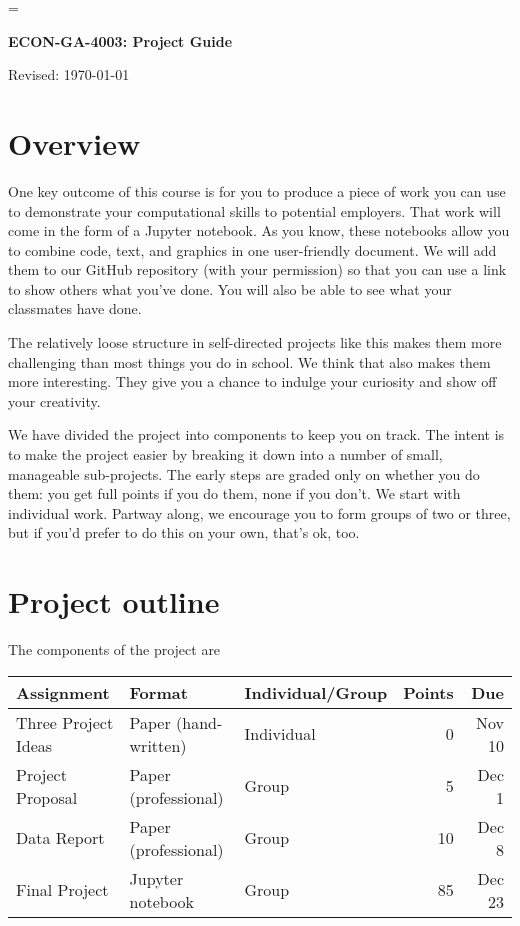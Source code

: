 \documentclass[11pt]{article}
\begin{document}
\parskip=\bigskipamount
\parindent=0.0in
\thispagestyle{empty}


\bigskip\bigskip
\centerline{\Large \bf ECON-GA-4003:  Project Guide}
\centerline{Revised: \today}

\section*{Overview}

One key outcome of this course is for you to produce a piece of work you can use
to demonstrate your computational skills to potential employers. That work will
come in the form of a Jupyter notebook. As you know, these
notebooks allow you to combine code, text, and graphics in one user-friendly
document. We will add them to our GitHub repository (with your permission) so that you can use a link
to show others what you've done. You will also be able to see what your
classmates have done.

The relatively loose structure in self-directed projects like this makes them
more challenging than most things you do in school. We think that also makes
them more interesting. They give you a chance to indulge your curiosity and show
off your creativity.

We have divided the project into components to keep you on track. The intent is
to make the project easier by breaking it down into a number of small,
manageable sub-projects. The early steps are graded only on whether you do them:
you get full points if you do them, none if you don't. We start with individual
work.  Partway along, we encourage you to form groups of two or three, but if
you'd prefer to do this on your own, that's ok, too.


\section*{Project outline}

The components of the project are
%
\begin{center}
\begin{tabular}{lllrr}
\toprule
Assignment                  & Format  & Individual/Group &  Points & Due \\
\midrule
Three Project Ideas         & Paper (hand-written)  & Individual  & 0 & Nov 10 \\
Project Proposal            & Paper (professional)  & Group       & 5 & Dec 1 \\
Data Report                 & Paper (professional)  & Group       & 10 & Dec 8 \\
Final Project               & Jupyter notebook      & Group       & 85 & Dec 23\\
\bottomrule
\end{tabular}
\end{center}
\end{document}
